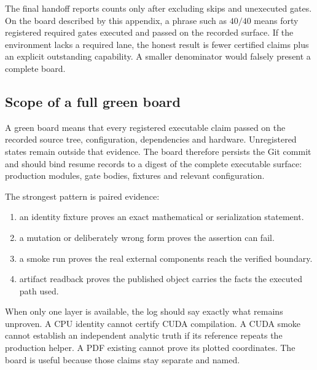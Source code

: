 The final handoff reports counts only after excluding skips and unexecuted
gates.  On the board described by this appendix, a phrase such as \(40/40\)
means forty registered required gates executed and passed on the recorded
surface.  If the environment lacks
a required lane, the honest result is fewer certified claims plus an explicit
outstanding capability.  A smaller denominator would falsely present a
complete board.

\subsection{Scope of a full green board}

A green board means that every registered executable claim passed on the
recorded source tree, configuration, dependencies and hardware.  Unregistered
states remain outside that evidence.  The board therefore persists the
Git commit and should bind resume records to a digest of the complete
executable surface: production modules, gate bodies, fixtures and relevant
configuration.

The strongest pattern is paired evidence:
\begin{enumerate}
  \item an identity fixture proves an exact mathematical or serialization
        statement.
  \item a mutation or deliberately wrong form proves the assertion can fail.
  \item a smoke run proves the real external components reach the verified
        boundary.
  \item artifact readback proves the published object carries the facts the
        executed path used.
\end{enumerate}
When only one layer is available, the log should say exactly what remains
unproven.  A CPU identity cannot certify CUDA compilation.  A CUDA smoke
cannot establish an independent analytic truth if its reference repeats the
production helper.  A PDF existing cannot prove its plotted coordinates.
The board is useful because those claims stay separate and named.

